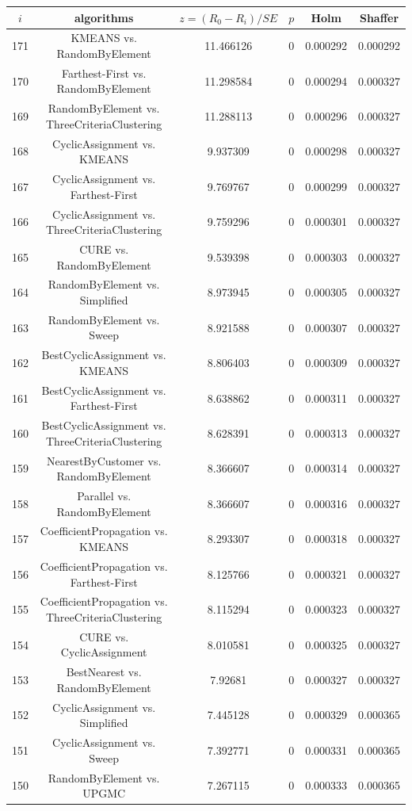 \documentclass[a4paper,10pt]{article}
\begin{document}
\begin{landscape}
\begin{table}[!htp]
\centering\scriptsize
\begin{tabular}{cccccc}
$i$&algorithms&$z=(R_0 - R_i)/SE$&$p$&Holm&Shaffer\\
\hline171&KMEANS vs. RandomByElement&11.466126&0&0.000292&0.000292\\
170&Farthest-First vs. RandomByElement&11.298584&0&0.000294&0.000327\\
169&RandomByElement vs. ThreeCriteriaClustering&11.288113&0&0.000296&0.000327\\
168&CyclicAssignment vs. KMEANS&9.937309&0&0.000298&0.000327\\
167&CyclicAssignment vs. Farthest-First&9.769767&0&0.000299&0.000327\\
166&CyclicAssignment vs. ThreeCriteriaClustering&9.759296&0&0.000301&0.000327\\
165&CURE vs. RandomByElement&9.539398&0&0.000303&0.000327\\
164&RandomByElement vs. Simplified&8.973945&0&0.000305&0.000327\\
163&RandomByElement vs. Sweep&8.921588&0&0.000307&0.000327\\
162&BestCyclicAssignment vs. KMEANS&8.806403&0&0.000309&0.000327\\
161&BestCyclicAssignment vs. Farthest-First&8.638862&0&0.000311&0.000327\\
160&BestCyclicAssignment vs. ThreeCriteriaClustering&8.628391&0&0.000313&0.000327\\
159&NearestByCustomer vs. RandomByElement&8.366607&0&0.000314&0.000327\\
158&Parallel vs. RandomByElement&8.366607&0&0.000316&0.000327\\
157&CoefficientPropagation vs. KMEANS&8.293307&0&0.000318&0.000327\\
156&CoefficientPropagation vs. Farthest-First&8.125766&0&0.000321&0.000327\\
155&CoefficientPropagation vs. ThreeCriteriaClustering&8.115294&0&0.000323&0.000327\\
154&CURE vs. CyclicAssignment&8.010581&0&0.000325&0.000327\\
153&BestNearest vs. RandomByElement&7.92681&0&0.000327&0.000327\\
152&CyclicAssignment vs. Simplified&7.445128&0&0.000329&0.000365\\
151&CyclicAssignment vs. Sweep&7.392771&0&0.000331&0.000365\\
150&RandomByElement vs. UPGMC&7.267115&0&0.000333&0.000365\\

\end{tabular}
\end{table}
\end{landscape}
\end{document}
